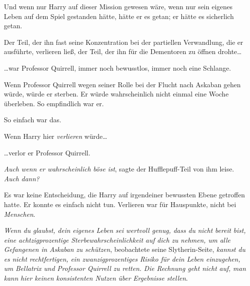 Und wenn nur Harry auf dieser Mission gewesen wäre, wenn nur sein eigenes Leben auf dem Spiel gestanden hätte, hätte er es getan; er hätte es sicherlich getan.

Der Teil, der ihn fast seine Konzentration bei der partiellen Verwandlung, die er ausführte, verlieren ließ, der Teil, der ihn für die Dementoren zu öffnen drohte…

…war Professor Quirrell, immer noch bewusstlos, immer noch eine Schlange.

Wenn Professor Quirrell wegen seiner Rolle bei der Flucht nach Askaban gehen würde, würde er sterben. Er würde wahrscheinlich nicht einmal eine Woche überleben. So empfindlich war er.

So einfach war das.

Wenn Harry hier \emph{verlieren} würde…

…verlor er Professor Quirrell.

\emph{Auch wenn er wahrscheinlich böse ist}, sagte der Hufflepuff-Teil von ihm leise. \emph{Auch dann?}

Es war keine Entscheidung, die Harry auf irgendeiner bewussten Ebene getroffen hatte. Er konnte es einfach nicht tun. Verlieren war für Hauspunkte, nicht bei \emph{Menschen}.

\emph{Wenn du glaubst, dein eigenes Leben sei wertvoll genug, dass du nicht bereit bist, eine achtzigprozentige Sterbewahrscheinlichkeit auf dich zu nehmen, um alle Gefangenen in Askaban zu schützen}, beobachtete seine Slytherin-Seite, \emph{kannst du es nicht rechtfertigen, ein zwanzigprozentiges Risiko für dein Leben einzugehen, um Bellatrix und Professor Quirrell zu retten. Die Rechnung geht nicht auf, man kann hier keinen konsistenten Nutzen über Ergebnisse stellen}.

